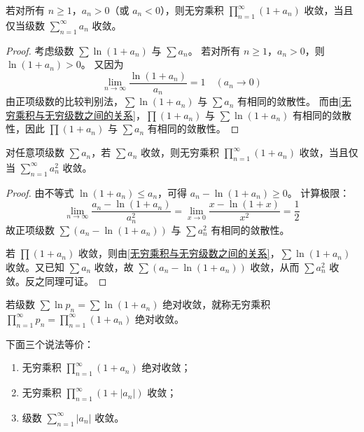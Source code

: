 \begin{corollary}\label{无穷乘积收敛}
	若对所有 $n \ge 1$，$a_n > 0$（或 $a_n < 0$），则无穷乘积 $\displaystyle \prod_{n=1}^{\infty} (1 + a_n)$ 收敛，当且仅当级数 $\displaystyle \sum_{n=1}^{\infty} a_n$ 收敛。
	
\end{corollary}
\begin{proof}
	考虑级数 $\sum \ln(1 + a_n)$ 与 $\sum a_n$。
	若对所有 $n \ge 1$，$a_n > 0$，则 $\ln(1 + a_n) > 0$。
	又因为
	\[
	\lim_{n \to \infty} \frac{\ln(1 + a_n)}{a_n} = 1 \quad (a_n \to 0)
	\]
	由正项级数的比较判别法，$\sum \ln(1 + a_n)$ 与 $\sum a_n$ 有相同的敛散性。
	而由\ref{无穷乘积与无穷级数之间的关系}，$\prod(1 + a_n)$ 与 $\sum \ln(1 + a_n)$ 有相同的敛散性，因此 $\prod(1 + a_n)$ 与 $\sum a_n$ 有相同的敛散性。
	
\end{proof}
\begin{corollary}
	对任意项级数 $\sum a_n$，若 $\sum a_n$ 收敛，则无穷乘积 $\displaystyle \prod_{n=1}^{\infty} (1 + a_n)$ 收敛，当且仅当 $\displaystyle \sum_{n=1}^{\infty} a_n^2$ 收敛。
	
\end{corollary}
\begin{proof}
	由不等式 $\ln(1 + a_n) \le a_n$，可得 $a_n - \ln(1 + a_n) \ge 0$。
	计算极限：
	\[
	\lim_{n \to \infty} \frac{a_n - \ln(1 + a_n)}{a_n^2} = \lim_{x \to 0} \frac{x - \ln(1 + x)}{x^2} = \frac{1}{2}
	\]
	故正项级数 $\sum (a_n - \ln(1 + a_n))$ 与 $\sum a_n^2$ 有相同的敛散性。
	
	若 $\prod(1 + a_n)$ 收敛，则由\ref{无穷乘积与无穷级数之间的关系}，$\sum \ln(1 + a_n)$ 收敛。又已知 $\sum a_n$ 收敛，故 $\sum (a_n - \ln(1 + a_n))$ 收敛，从而 $\sum a_n^2$ 收敛。反之同理可证。
\end{proof}
\begin{definition}
	若级数 $\sum \ln p_n = \sum \ln(1 + a_n)$ 绝对收敛，就称无穷乘积 $\displaystyle \prod_{n=1}^{\infty} p_n = \prod_{n=1}^{\infty} (1 + a_n)$ 绝对收敛。
\end{definition}
\begin{proposition}
	下面三个说法等价：
	\begin{enumerate}
		\item 无穷乘积 $\displaystyle \prod_{n=1}^{\infty} (1 + a_n)$ 绝对收敛；
		\item 无穷乘积 $\displaystyle \prod_{n=1}^{\infty} (1 + |a_n|)$ 收敛；
		\item 级数 $\displaystyle \sum_{n=1}^{\infty} |a_n|$ 收敛。
	\end{enumerate}
\end{proposition}
